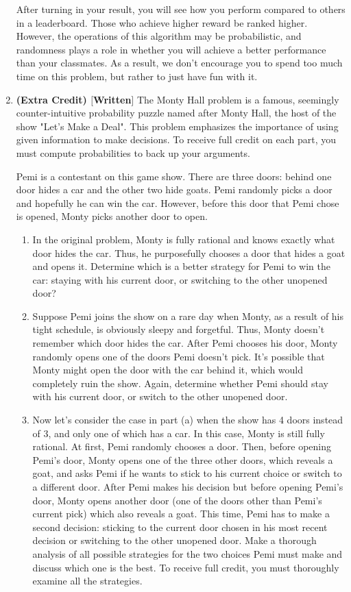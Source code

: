 \documentclass[12pt]{article}
\renewcommand{\|}{\mid}
\begin{document}
\begin{enumerate}
After turning in your result, you will see how you perform compared to others in a leaderboard. Those who achieve higher reward be ranked higher. However, the operations of this algorithm may be probabilistic, and randomness plays a role in whether you will achieve a better performance than your classmates. As a result, we don't encourage you to spend too much time on this problem, but rather to just have fun with it.

\pagebreak

\item \textbf{(Extra Credit) $[$Written$]$} The Monty Hall problem is a famous, seemingly counter-intuitive probability puzzle named after Monty Hall, the host of the show "Let's Make a Deal". This problem emphasizes the importance of using given information to make decisions. To receive full credit on each part, you must compute probabilities to back up your arguments.

Pemi is a contestant on this game show. There are three doors: behind one door hides a car and the other two hide goats. Pemi randomly picks a door and hopefully he can win the car. However, before this door that Pemi chose is opened, Monty picks another door to open.
\begin{enumerate}
    \item In the original problem, Monty is fully rational and knows exactly what door hides the car. Thus, he purposefully chooses a door that hides a goat and opens it. Determine which is a better strategy for Pemi to win the car: staying with his current door, or switching to the other unopened door?
    \item Suppose Pemi joins the show on a rare day when Monty, as a result of his tight schedule, is obviously sleepy and forgetful. Thus, Monty doesn't remember which door hides the car. After Pemi chooses his door, Monty randomly opens one of the doors Pemi doesn't pick. It's possible that Monty might open the door with the car behind it, which would completely ruin the show. Again, determine whether Pemi should stay with his current door, or switch to the other unopened door.
    \item Now let's consider the case in part (a) when the show has 4 doors instead of 3, and only one of which has a car. In this case, Monty is still fully rational. At first, Pemi randomly chooses a door. Then, before opening Pemi's door, Monty opens one of the three other doors, which reveals a goat, and asks Pemi if he wants to stick to his current choice or switch to a different door. After Pemi makes his decision but before opening Pemi's door, Monty opens another door (one of the doors other than Pemi's current pick) which also reveals a goat. This time, Pemi has to make a second decision: sticking to the current door chosen in his most recent decision or switching to the other unopened door. Make a thorough analysis of all possible strategies for the two choices Pemi must make and discuss which one is the best. To receive full credit, you must thoroughly examine all the strategies.
\end{enumerate}


\end{enumerate}
\end{document}
